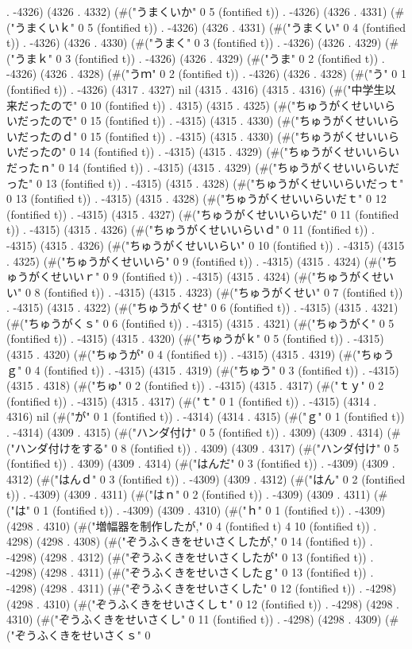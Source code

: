 . -4326) (4326 . 4332) (#("うまくいか" 0 5 (fontified t)) . -4326) (4326 . 4331) (#("うまくいｋ" 0 5 (fontified t)) . -4326) (4326 . 4331) (#("うまくい" 0 4 (fontified t)) . -4326) (4326 . 4330) (#("うまく" 0 3 (fontified t)) . -4326) (4326 . 4329) (#("うまｋ" 0 3 (fontified t)) . -4326) (4326 . 4329) (#("うま" 0 2 (fontified t)) . -4326) (4326 . 4328) (#("うｍ" 0 2 (fontified t)) . -4326) (4326 . 4328) (#("う" 0 1 (fontified t)) . -4326) (4317 . 4327) nil (4315 . 4316) (4315 . 4316) (#("中学生以来だったので" 0 10 (fontified t)) . 4315) (4315 . 4325) (#("ちゅうがくせいいらいだったので" 0 15 (fontified t)) . -4315) (4315 . 4330) (#("ちゅうがくせいいらいだったのｄ" 0 15 (fontified t)) . -4315) (4315 . 4330) (#("ちゅうがくせいいらいだったの" 0 14 (fontified t)) . -4315) (4315 . 4329) (#("ちゅうがくせいいらいだったｎ" 0 14 (fontified t)) . -4315) (4315 . 4329) (#("ちゅうがくせいいらいだった" 0 13 (fontified t)) . -4315) (4315 . 4328) (#("ちゅうがくせいいらいだっｔ" 0 13 (fontified t)) . -4315) (4315 . 4328) (#("ちゅうがくせいいらいだｔ" 0 12 (fontified t)) . -4315) (4315 . 4327) (#("ちゅうがくせいいらいだ" 0 11 (fontified t)) . -4315) (4315 . 4326) (#("ちゅうがくせいいらいｄ" 0 11 (fontified t)) . -4315) (4315 . 4326) (#("ちゅうがくせいいらい" 0 10 (fontified t)) . -4315) (4315 . 4325) (#("ちゅうがくせいいら" 0 9 (fontified t)) . -4315) (4315 . 4324) (#("ちゅうがくせいいｒ" 0 9 (fontified t)) . -4315) (4315 . 4324) (#("ちゅうがくせいい" 0 8 (fontified t)) . -4315) (4315 . 4323) (#("ちゅうがくせい" 0 7 (fontified t)) . -4315) (4315 . 4322) (#("ちゅうがくせ" 0 6 (fontified t)) . -4315) (4315 . 4321) (#("ちゅうがくｓ" 0 6 (fontified t)) . -4315) (4315 . 4321) (#("ちゅうがく" 0 5 (fontified t)) . -4315) (4315 . 4320) (#("ちゅうがｋ" 0 5 (fontified t)) . -4315) (4315 . 4320) (#("ちゅうが" 0 4 (fontified t)) . -4315) (4315 . 4319) (#("ちゅうｇ" 0 4 (fontified t)) . -4315) (4315 . 4319) (#("ちゅう" 0 3 (fontified t)) . -4315) (4315 . 4318) (#("ちゅ" 0 2 (fontified t)) . -4315) (4315 . 4317) (#("ｔｙ" 0 2 (fontified t)) . -4315) (4315 . 4317) (#("ｔ" 0 1 (fontified t)) . -4315) (4314 . 4316) nil (#("が" 0 1 (fontified t)) . -4314) (4314 . 4315) (#("ｇ" 0 1 (fontified t)) . -4314) (4309 . 4315) (#("ハンダ付け" 0 5 (fontified t)) . 4309) (4309 . 4314) (#("ハンダ付けをする" 0 8 (fontified t)) . 4309) (4309 . 4317) (#("ハンダ付け" 0 5 (fontified t)) . 4309) (4309 . 4314) (#("はんだ" 0 3 (fontified t)) . -4309) (4309 . 4312) (#("はんｄ" 0 3 (fontified t)) . -4309) (4309 . 4312) (#("はん" 0 2 (fontified t)) . -4309) (4309 . 4311) (#("はｎ" 0 2 (fontified t)) . -4309) (4309 . 4311) (#("は" 0 1 (fontified t)) . -4309) (4309 . 4310) (#("ｈ" 0 1 (fontified t)) . -4309) (4298 . 4310) (#("増幅器を制作したが," 0 4 (fontified t) 4 10 (fontified t)) . 4298) (4298 . 4308) (#("ぞうふくきをせいさくしたが," 0 14 (fontified t)) . -4298) (4298 . 4312) (#("ぞうふくきをせいさくしたが" 0 13 (fontified t)) . -4298) (4298 . 4311) (#("ぞうふくきをせいさくしたｇ" 0 13 (fontified t)) . -4298) (4298 . 4311) (#("ぞうふくきをせいさくした" 0 12 (fontified t)) . -4298) (4298 . 4310) (#("ぞうふくきをせいさくしｔ" 0 12 (fontified t)) . -4298) (4298 . 4310) (#("ぞうふくきをせいさくし" 0 11 (fontified t)) . -4298) (4298 . 4309) (#("ぞうふくきをせいさくｓ" 0 